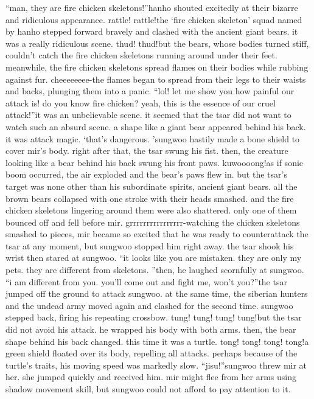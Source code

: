 “man, they are fire chicken skeletons!”hanho shouted excitedly at their bizarre and ridiculous appearance.
rattle! rattle!the ‘fire chicken skeleton’ squad named by hanho stepped forward bravely and clashed with the ancient giant bears.
 it was a really ridiculous scene.
thud! thud!but the bears, whose bodies turned stiff, couldn’t catch the fire chicken skeletons running around under their feet.
meanwhile, the fire chicken skeletons spread flames on their bodies while rubbing against fur.
cheeeeeeee-the flames began to spread from their legs to their waists and backs, plunging them into a panic.
“lol! let me show you how painful our attack is! do you know fire chicken? yeah, this is the essence of our cruel attack!”it was an unbelievable scene.
it seemed that the tsar did not want to watch such an absurd scene.
 a shape like a giant bear appeared behind his back.
 it was attack magic.
‘that’s dangerous.
’sungwoo hastily made a bone shield to cover mir’s body.
 right after that, the tsar swung his fist.
 then, the creature looking like a bear behind his back swung his front paws.
kuwoooong!as if sonic boom occurred, the air exploded and the bear’s paws flew in.
but the tsar’s target was none other than his subordinate spirits, ancient giant bears.
all the brown bears collapsed with one stroke with their heads smashed.
and the fire chicken skeletons lingering around them were also shattered.
 only one of them bounced off and fell before mir.
grrrrrrrrrrrrrrrr-watching the chicken skeletons smashed to pieces, mir became so excited that he was ready to counterattack the tsar at any moment, but sungwoo stopped him right away.
the tsar shook his wrist then stared at sungwoo.
“it looks like you are mistaken.
 they are only my pets.
 they are different from skeletons.
”then, he laughed scornfully at sungwoo.
“i am different from you.
 you’ll come out and fight me, won’t you?”the tsar jumped off the ground to attack sungwoo.
 at the same time, the siberian hunters and the undead army moved again and clashed for the second time.
sungwoo stepped back, firing his repeating crossbow.
tung! tung! tung! tung!but the tsar did not avoid his attack.
 he wrapped his body with both arms.
 then, the bear shape behind his back changed.
 this time it was a turtle.
tong! tong! tong! tong!a green shield floated over its body, repelling all attacks.
 perhaps because of the turtle’s traits, his moving speed was markedly slow.
“jisu!”sungwoo threw mir at her.
 she jumped quickly and received him.
mir might flee from her arms using shadow movement skill, but sungwoo could not afford to pay attention to it.
